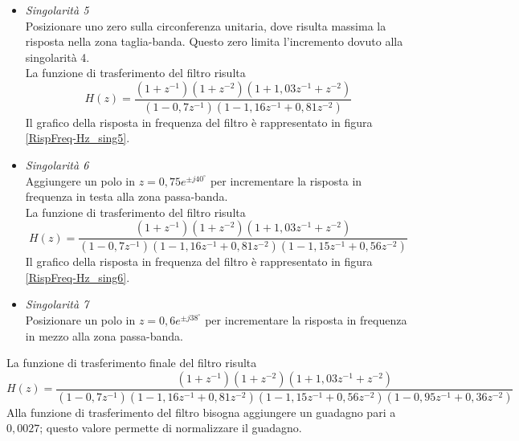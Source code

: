 \begin{itemize}
\item \emph{Singolarit\`a 5} \\
Posizionare uno zero sulla circonferenza unitaria, dove risulta massima la risposta nella zona taglia-banda. Questo zero limita l'incremento dovuto alla singolarit\`a 4.\\
La funzione di trasferimento del filtro risulta
\begin{displaymath}
H(z)=\frac{(1+z^{-1})(1+z^{-2})(1+1,03z^{-1}+z^{-2})}{(1-0,7z^{-1})(1-1,16z^{-1}+0,81z^{-2})}
\end{displaymath}
Il grafico della risposta in frequenza del filtro \`e rappresentato in figura \ref{RispFreq-Hz_sing5}.


\item \emph{Singolarit\`a 6} \\
Aggiungere un polo in $z=0,75e^{\pm j40^{\circ}}$ per incrementare la risposta in frequenza in testa alla zona passa-banda.\\
La funzione di trasferimento del filtro risulta
\begin{displaymath}
H(z)=\frac{(1+z^{-1})(1+z^{-2})(1+1,03z^{-1}+z^{-2})}{(1-0,7z^{-1})(1-1,16z^{-1}+0,81z^{-2})(1-1,15z^{-1}+0,56z^{-2})}
\end{displaymath}
Il grafico della risposta in frequenza del filtro \`e rappresentato in figura \ref{RispFreq-Hz_sing6}.


\item \emph{Singolarit\`a 7} \\
Posizionare un polo in $z=0,6e^{\pm j38^{\circ}}$ per incrementare la risposta in frequenza in mezzo alla zona passa-banda.\\
\end{itemize}
La funzione di trasferimento finale del filtro risulta
\begin{displaymath}
\textstyle
H(z)=\frac{(1+z^{-1})(1+z^{-2})(1+1,03z^{-1}+z^{-2})}{(1-0,7z^{-1})(1-1,16z^{-1}+0,81z^{-2})(1-1,15z^{-1}+0,56z^{-2})(1-0,95z^{-1}+0,36z^{-2})}
\end{displaymath}
Alla funzione di trasferimento del filtro bisogna aggiungere un guadagno pari a $0,0027$; questo valore permette di normalizzare il guadagno.


